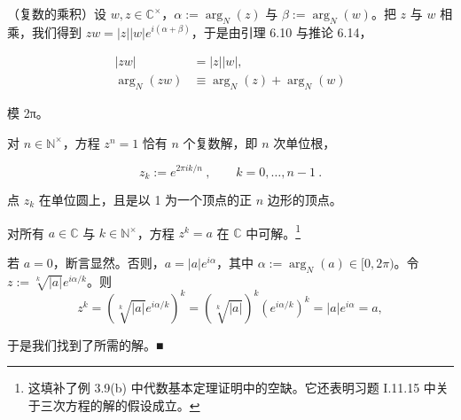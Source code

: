 \begin{remark}

\begin{items}
\item

（复数的乘积）设 $ w, z \in \mathbb{C}^\times $，$ \alpha := \arg_N(z) $ 与 $ \beta := \arg_N(w) $。把 $ z $ 与 $ w $ 相乘，我们得到 $ zw = |z||w| e^{i(\alpha + \beta)} $，于是由引理 6.10 与推论 6.14，

\end{items}

\begin{equation*}
\begin{aligned}
\left|zw\right|&=\left|z\right|\left|w\right|,\\\arg_{N}(zw)&\equiv\arg_{N}(z)+\arg_{N}(w)
\end{aligned}
\end{equation*}

模 2π。

\begin{items}
\item[（b）]

对 $ n \in \mathbb{N}^\times $，方程 $ z^n = 1 $ 恰有 $ n $ 个复数解，即 $ n $ 次单位根，

\[
z_{k}:=e^{2\pi i k/n}~,\qquad k=0,\ldots,n-1~.
\]

点 $ z_k $ 在单位圆上，且是以 1 为一个顶点的正 $ n $ 边形的顶点。

\item[（c）]

对所有 $ a \in \mathbb{C} $ 与 $ k \in \mathbb{N}^\times $，方程 $ z^k = a $ 在 $ \mathbb{C} $ 中可解。\footnote{这填补了例 3.9(b) 中代数基本定理证明中的空缺。它还表明习题 I.11.15 中关于三次方程的解的假设成立。}

\end{items}


\proofhead
若 $a=0$，断言显然。否则，$a=|a|e^{i\alpha}$，其中 $\alpha:=\arg_{N}(a)\in[0,2\pi)$。令 $z:=\sqrt[k]{|a|}e^{i\alpha/k}$。则
\[
z^{k}=(\sqrt[k]{|a|}e^{i\alpha/k})^{k}=(\sqrt[k]{|a|})^{k}(e^{i\alpha/k})^{k}=|a|e^{i\alpha}=a,
\]

于是我们找到了所需的解。■

\begin{items}
\item[（d）]


\end{items}
\end{remark}
